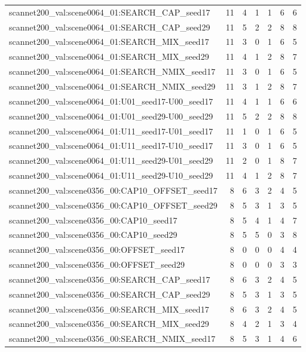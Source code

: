 \begin{table}[t]
\begin{tabular}{lrrrrrr}
scannet200\_val:scene0064\_01:SEARCH\_CAP\_seed17 & 11 & 4 & 1 & 1 & 6 & 6 \\
scannet200\_val:scene0064\_01:SEARCH\_CAP\_seed29 & 11 & 5 & 2 & 2 & 8 & 8 \\
scannet200\_val:scene0064\_01:SEARCH\_MIX\_seed17 & 11 & 3 & 0 & 1 & 6 & 5 \\
scannet200\_val:scene0064\_01:SEARCH\_MIX\_seed29 & 11 & 4 & 1 & 2 & 8 & 7 \\
scannet200\_val:scene0064\_01:SEARCH\_NMIX\_seed17 & 11 & 3 & 0 & 1 & 6 & 5 \\
scannet200\_val:scene0064\_01:SEARCH\_NMIX\_seed29 & 11 & 3 & 1 & 2 & 8 & 7 \\
scannet200\_val:scene0064\_01:U01\_seed17-U00\_seed17 & 11 & 4 & 1 & 1 & 6 & 6 \\
scannet200\_val:scene0064\_01:U01\_seed29-U00\_seed29 & 11 & 5 & 2 & 2 & 8 & 8 \\
scannet200\_val:scene0064\_01:U11\_seed17-U01\_seed17 & 11 & 1 & 0 & 1 & 6 & 5 \\
scannet200\_val:scene0064\_01:U11\_seed17-U10\_seed17 & 11 & 3 & 0 & 1 & 6 & 5 \\
scannet200\_val:scene0064\_01:U11\_seed29-U01\_seed29 & 11 & 2 & 0 & 1 & 8 & 7 \\
scannet200\_val:scene0064\_01:U11\_seed29-U10\_seed29 & 11 & 4 & 1 & 2 & 8 & 7 \\
scannet200\_val:scene0356\_00:CAP10\_OFFSET\_seed17 & 8 & 6 & 3 & 2 & 4 & 5 \\
scannet200\_val:scene0356\_00:CAP10\_OFFSET\_seed29 & 8 & 5 & 3 & 1 & 3 & 5 \\
scannet200\_val:scene0356\_00:CAP10\_seed17 & 8 & 5 & 4 & 1 & 4 & 7 \\
scannet200\_val:scene0356\_00:CAP10\_seed29 & 8 & 5 & 5 & 0 & 3 & 8 \\
scannet200\_val:scene0356\_00:OFFSET\_seed17 & 8 & 0 & 0 & 0 & 4 & 4 \\
scannet200\_val:scene0356\_00:OFFSET\_seed29 & 8 & 0 & 0 & 0 & 3 & 3 \\
scannet200\_val:scene0356\_00:SEARCH\_CAP\_seed17 & 8 & 6 & 3 & 2 & 4 & 5 \\
scannet200\_val:scene0356\_00:SEARCH\_CAP\_seed29 & 8 & 5 & 3 & 1 & 3 & 5 \\
scannet200\_val:scene0356\_00:SEARCH\_MIX\_seed17 & 8 & 6 & 3 & 2 & 4 & 5 \\
scannet200\_val:scene0356\_00:SEARCH\_MIX\_seed29 & 8 & 4 & 2 & 1 & 3 & 4 \\
scannet200\_val:scene0356\_00:SEARCH\_NMIX\_seed17 & 8 & 5 & 3 & 1 & 4 & 6 \\

\end{tabular}
\end{table}

